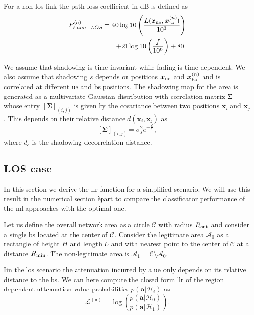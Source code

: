 \documentclass[twocolumns]{IEEEtran}
\begin{document}
For a  non-\ac{los} link the path loss coefficient in dB is defined as
\begin{equation}
\begin{split}
    P_{\ell, non-LOS}^{(n)} = 40\log10\left (\frac{L(\bm{x}_{\rm ue},\bm{x}_{\rm bs}^{(n)})}{10^3}\right ) \\
    + 21\log10\left(\frac{f}{10^6}\right) + 80.
    \end{split}
\end{equation}

We assume that shadowing is time-invariant while fading is time dependent. We also assume that shadowing $s$ depends on positions $\bm{x}_{\rm ue}$ and $\bm{x}_{\rm bs}^{(n)}$ and is correlated at different \ac{ue} and \ac{bs} positions. The shadowing map for the area is generated as a multivariate Gaussian distribution with correlation matrix $\bm{\Sigma}$ whose entry $\left[\bm{\Sigma}\right]_{(i,j)}$ is given by the covariance between two positions $\bm{x}_i$ and $\bm{x}_j$. This depends on their relative distance $d(\bm{x}_i,\bm{x}_j)$ as
\begin{equation}\label{eq: coor mat}
    \left[\bm{\Sigma}\right]_{(i,j)} = \sigma_s^2e^{-\frac{d}{d_c}},
\end{equation}
where $d_c$ is the shadowing decorrelation distance. 

\subsection{LOS case}

In this section we derive the \ac{llr} function for a simplified scenario. We will use this result in the numerical section èpart to compare the classificator performance of the \ac{ml} approaches with the optimal one.

Let us define the overall network area as a circle $\mathcal{C}$ with radius $R_{\rm out}$ and consider a single \ac{bs} located at the center of $\mathcal{C}$. Consider the legitimate area $\mathcal{A}_{0}$ as a rectangle of height $H$ and length $L$ and with nearest point to the center of $\mathcal{C}$ at a distance $R_{\rm min}$. The non-legitimate area is $\mathcal{A}_1 = \mathcal{C} \setminus \mathcal{A}_0$.

Iin the \ac{los} scenario the attenuation incurred by a \ac{ue} only depends on its relative distance to the \ac{bs}. We can here compute the closed form \ac{llr} of the region dependent attenuation value probabilities $p(\bm{a}|\mathcal{H}_i)$ as
\begin{equation}\label{eq:lr}
    \mathcal{L}^{(\bm{a})}=\log\left(\frac{p(\bm{a}|\mathcal{H}_0)}{p(\bm{a}|\mathcal{H}_1)}\right).
\end{equation}
\end{document}
